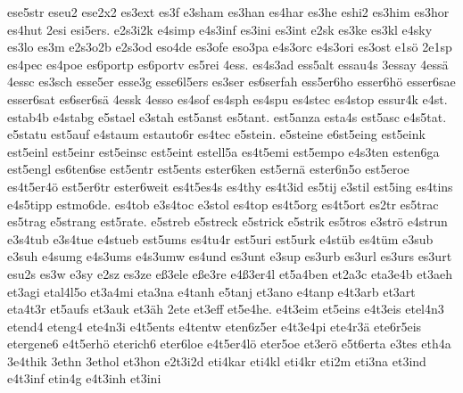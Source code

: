 {    ese5str
    eseu2
    ese2x2
    es3ext
    es3f
    e3sham
    es3han
    es4har
    es3he
    eshi2
    es3him
    es3hor
    es4hut
    2esi
    esi5ers.
    e2s3i2k
    e4simp
    e4s3inf
    es3ini
    es3int
    e2sk
    es3ke
    es3kl
    e4sky
    es3lo
    es3m
    e2s3o2b
    e2s3od
    eso4de
    es3ofe
    eso3pa
    e4s3orc
    e4s3ori
    es3ost
    e1sö
    2e1sp
    es4pec
    es4poe
    es6portp
    es6portv
    es5rei
    4ess.
    es4s3ad
    ess5alt
    essau4s
    3essay
    4essä
    4essc
    es3sch
    esse5er
    esse3g
    esse6l5ers
    es3ser
    es6serfah
    ess5er6ho
    esser6hö
    esser6sae
    esser6sat
    es6ser6sä
    4essk
    4esso
    es4sof
    es4sph
    es4spu
    es4stec
    es4stop
    essur4k
    e4st.
    estab4b
    e4stabg
    e5stael
    e3stah
    est5anst
    es5tant.
    est5anza
    esta4s
    est5asc
    e4s5tat.
    e5statu
    est5auf
    e4staum
    estauto6r
    es4tec
    e5stein.
    e5steine
    e6st5eing
    est5eink
    est5einl
    est5einr
    est5einsc
    est5eint
    estell5a
    es4t5emi
    est5empo
    e4s3ten
    esten6ga
    est5engl
    es6ten6se
    est5entr
    est5ents
    ester6ken
    est5ernä
    ester6n5o
    est5eroe
    es4t5er4ö
    est5er6tr
    ester6weit
    es4t5es4s
    es4thy
    es4t3id
    es5tij
    e3stil
    est5ing
    es4tins
    e4s5tipp
    estmo6de.
    es4tob
    e3s4toc
    e3stol
    es4top
    es4t5org
    es4t5ort
    es2tr
    es5trac
    es5trag
    e5strang
    est5rate.
    e5streb
    e5streck
    e5strick
    e5strik
    es5tros
    e3strö
    e4strun
    e3s4tub
    e3s4tue
    e4stueb
    est5ums
    es4tu4r
    est5uri
    est5urk
    e4stüb
    es4tüm
    e3sub
    e3suh
    e4sumg
    e4s3ums
    e4s3umw
    es4und
    es3unt
    e3sup
    es3urb
    es3url
    es3urs
    es3urt
    esu2s
    es3w
    e3sy
    e2sz
    es3ze
    eß3ele
    eße3re
    e4ß3er4l
    et5a4ben
    et2a3c
    eta3e4b
    et3aeh
    et3agi
    etal4l5o
    et3a4mi
    eta3na
    e4tanh
    e5tanj
    et3ano
    e4tanp
    e4t3arb
    et3art
    eta4t3r
    et5aufs
    et3auk
    et3äh
    2ete
    et3eff
    et5e4he.
    e4t3eim
    et5eins
    e4t3eis
    etel4n3
    etend4
    eteng4
    ete4n3i
    e4t5ents
    e4tentw
    eten6z5er
    e4t3e4pi
    ete4r3ä
    ete6r5eis
    etergene6
    e4t5erhö
    eterich6
    eter6loe
    e4t5er4lö
    eter5oe
    et3erö
    e5t6erta
    e3tes
    eth4a
    3e4thik
    3ethn
    3ethol
    et3hon
    e2t3i2d
    eti4kar
    eti4kl
    eti4kr
    eti2m
    eti3na
    et3ind
    e4t3inf
    etin4g
    e4t3inh
    et3ini
}
